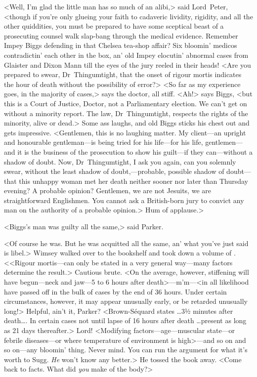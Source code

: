 <Well, I'm glad the little man has so much of an alibi,> said Lord~Peter, <though if you're only glueing your faith to cadaveric lividity, rigidity, and all the other quiddities, you must be prepared to have some sceptical beast of a prosecuting counsel walk slap-bang through the medical evidence. Remember Impey Biggs defending in that Chelsea tea-shop affair? Six bloomin' medicos contradictin' each other in the box, an' old Impey elocutin' abnormal cases from Glaister and Dixon Mann till the eyes of the jury reeled in their heads! <Are you prepared to swear, Dr~Thingumtight, that the onset of rigour mortis indicates the hour of death without the possibility of error?> <So far as my experience goes, in the majority of cases,> says the doctor, all stiff. <Ah!> says Biggs, <but this is a Court of Justice, Doctor, not a Parliamentary election. We can't get on without a minority report. The law, Dr~Thingumtight, respects the rights of the minority, alive or dead.> Some ass laughs, and old Biggs sticks his chest out and gets impressive. <Gentlemen, this is no laughing matter. My client—an upright and honourable gentleman—is being tried for his life—for his life, gentlemen—and it is the business of the prosecution to show his guilt—if they can—without a shadow of doubt. Now, Dr~Thingumtight, I ask you again, can you solemnly swear, without the least shadow of doubt,—probable, possible shadow of doubt—that this unhappy woman met her death neither sooner nor later than Thursday evening? A probable opinion? Gentlemen, we are not Jesuits, we are straightforward Englishmen. You cannot ask a British-born jury to convict any man on the authority of a probable opinion.> Hum of applause.>

<Biggs's man was guilty all the same,> said Parker.

<Of course he was. But he was acquitted all the same, an' what you've just said is libel.> Wimsey walked over to the bookshelf and took down a volume of . <<Rigour mortis—can only be stated in a very general way—many factors determine the result.> Cautious brute. <On the average, however, stiffening will have begun—neck and jaw—5 to 6 hours after death>—m'm—<in all likelihood have passed off in the bulk of cases by the end of 36 hours. Under certain circumstances, however, it may appear unusually early, or be retarded unusually long!> Helpful, ain't it, Parker? <Brown-Séquard states \dots 3½ minutes after death\dots . In certain cases not until lapse of 16 hours after death \dots present as long as 21 days thereafter.> Lord! <Modifying factors—age—muscular state—or febrile diseases—or where temperature of environment is high>—and so on and so on—any bloomin' thing. Never mind. You can run the argument for what it's worth to Sugg. \emph{He} won't know any better.> He tossed the book away. <Come back to facts. What did \emph{you} make of the body?>

